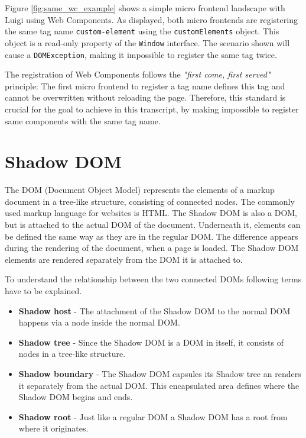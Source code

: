 Figure \ref{fig:same_wc_example} shows a simple micro frontend landscape with Luigi using Web Components. As displayed, both micro frontends are registering the same tag name \texttt{custom-element} using the \texttt{customElements} object. This object is a read-only property of the \texttt{Window} interface.
The scenario shown will cause a  \texttt{DOMException}, making it impossible to register the same tag twice.

The registration of Web Components follows the \textit{"first come, first served"} principle: The first micro frontend to register a tag name defines this tag and cannot be overwritten without reloading the page.\cite{mdn_web_docs_define}
Therefore, this standard is crucial for the goal to achieve in this transcript, by making impossible to register same components with the same tag name.

\section{Shadow DOM}

The DOM (Document Object Model) represents the elements of a markup document in a tree-like structure, consisting of connected nodes. The commonly used markup language for websites is HTML. \cite{wc_shadow_dom}
The Shadow DOM is also a DOM, but is attached to the actual DOM of the document. Underneath it, elements can be defined the same way as they are in the regular DOM. The difference appears during the rendering of the document, when a page is loaded. The Shadow DOM elements are rendered separately from the DOM it is attached to.\cite{simon_thesis}

To understand the relationship between the two connected DOMs following terms have to be explained.

\begin{itemize}
	\item \textbf{Shadow host} - The attachment of the Shadow DOM to the normal DOM happens via a node inside the normal DOM.
	\item \textbf{Shadow tree} - Since the Shadow DOM is a DOM in itself, it consists of nodes in a tree-like structure.
	\item \textbf{Shadow boundary} - The Shadow DOM capsules its Shadow tree an renders it separately from the actual DOM. This encapsulated area defines where the Shadow DOM begins and ends.
	\item \textbf{Shadow root} - Just like a regular DOM a Shadow DOM has a root from where it originates.
\end{itemize} 

